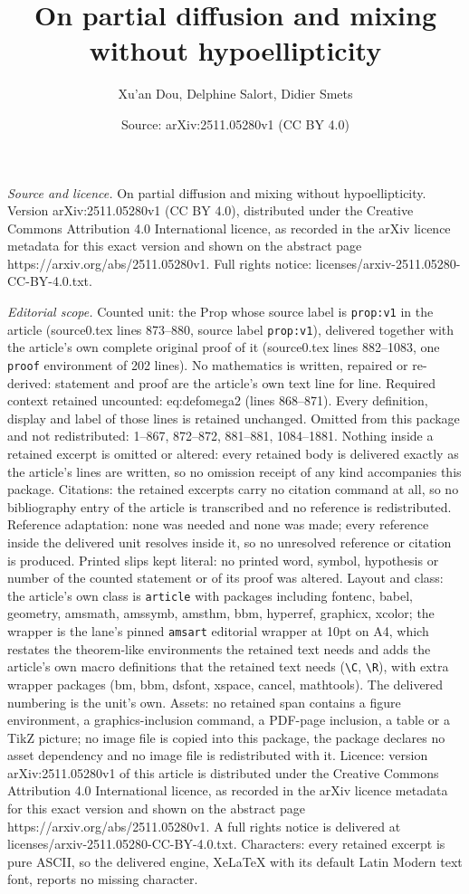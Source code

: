 \documentclass[10pt,a4paper]{amsart}
\title[On partial diffusion and mixing without hypoellipticity]{On partial diffusion and mixing without hypoellipticity}
\author{Xu'an Dou, Delphine Salort, Didier Smets}
\date{Source: arXiv:2511.05280v1 (CC BY 4.0)}
\begin{document}
\maketitle

\noindent\emph{Source and licence.} On partial diffusion and mixing without hypoellipticity. Version arXiv:2511.05280v1 (CC BY 4.0), distributed under the Creative Commons Attribution 4.0 International licence, as recorded in the arXiv licence metadata for this exact version and shown on the abstract page https://arxiv.org/abs/2511.05280v1. Full rights notice: licenses/arxiv-2511.05280-CC-BY-4.0.txt.\par\smallskip

\noindent\textit{Editorial scope.} Counted unit: the Prop whose source label is \texttt{prop:v1} in the article (source0.tex lines 873--880, source label \texttt{prop:v1}), delivered together with the article's own complete original proof of it (source0.tex lines 882--1083, one \texttt{proof} environment of 202 lines). No mathematics is written, repaired or re-derived: statement and proof are the article's own text line for line. Required context retained uncounted: eq:defomega2 (lines 868--871). Every definition, display and label of those lines is retained unchanged. Omitted from this package and not redistributed: 1--867, 872--872, 881--881, 1084--1881. Nothing inside a retained excerpt is omitted or altered: every retained body is delivered exactly as the article's lines are written, so no omission receipt of any kind accompanies this package. Citations: the retained excerpts carry no citation command at all, so no bibliography entry of the article is transcribed and no reference is redistributed. Reference adaptation: none was needed and none was made; every reference inside the delivered unit resolves inside it, so no unresolved reference or citation is produced. Printed slips kept literal: no printed word, symbol, hypothesis or number of the counted statement or of its proof was altered. Layout and class: the article's own class is \texttt{article} with packages including fontenc, babel, geometry, amsmath, amssymb, amsthm, bbm, hyperref, graphicx, xcolor; the wrapper is the lane's pinned \texttt{amsart} editorial wrapper at 10pt on A4, which restates the theorem-like environments the retained text needs and adds the article's own macro definitions that the retained text needs (\texttt{\textbackslash C}, \texttt{\textbackslash R}), with extra wrapper packages (bm, bbm, dsfont, xspace, cancel, mathtools). The delivered numbering is the unit's own. Assets: no retained span contains a figure environment, a graphics-inclusion command, a PDF-page inclusion, a table or a TikZ picture; no image file is copied into this package, the package declares no asset dependency and no image file is redistributed with it. Licence: version arXiv:2511.05280v1 of this article is distributed under the Creative Commons Attribution 4.0 International licence, as recorded in the arXiv licence metadata for this exact version and shown on the abstract page https://arxiv.org/abs/2511.05280v1. A full rights notice is delivered at licenses/arxiv-2511.05280-CC-BY-4.0.txt. Characters: every retained excerpt is pure ASCII, so the delivered engine, XeLaTeX with its default Latin Modern text font, reports no missing character.
\end{document}
